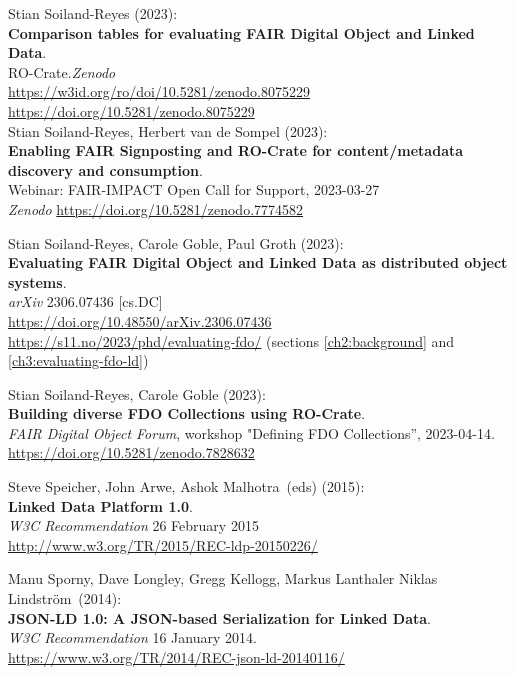 \begin{thebibliography}{9}
Stian Soiland-Reyes (2023):\\
\textbf{Comparison tables for evaluating FAIR Digital Object and Linked Data}.\\
RO-Crate.\emph{Zenodo}\\
\url{https://w3id.org/ro/doi/10.5281/zenodo.8075229}\\
\url{https://doi.org/10.5281/zenodo.8075229}\\

Stian Soiland-Reyes, Herbert van de Sompel (2023):\\
\textbf{Enabling FAIR Signposting and RO-Crate for content/metadata discovery and consumption}.\\
Webinar: FAIR-IMPACT Open Call for Support, 2023-03-27 \\
\emph{Zenodo}
\url{https://doi.org/10.5281/zenodo.7774582}

Stian Soiland-Reyes, Carole Goble, Paul Groth (2023):\\
\textbf{Evaluating FAIR Digital Object and Linked Data as distributed object systems}.\\
\emph{arXiv} 2306.07436 [cs.DC] \\
\url{https://doi.org/10.48550/arXiv.2306.07436}\\
\url{https://s11.no/2023/phd/evaluating-fdo/}
(sections \vref{ch2:background} and \vref{ch3:evaluating-fdo-ld})

Stian Soiland-Reyes, Carole Goble (2023):\\
\textbf{Building diverse FDO Collections using RO-Crate}.\\
\emph{FAIR Digital Object Forum}, workshop "Defining FDO Collections”, 2023-04-14.\\
\url{https://doi.org/10.5281/zenodo.7828632}

Steve Speicher, John Arwe, Ashok Malhotra~(eds) (2015):\\
\textbf{Linked Data Platform 1.0}.\\ 
\emph{W3C Recommendation} 26 February 2015\\
\url{http://www.w3.org/TR/2015/REC-ldp-20150226/}

Manu Sporny, Dave Longley,  Gregg Kellogg,  Markus Lanthaler
Niklas Lindström~(2014):\\
\textbf{JSON-LD 1.0: A JSON-based Serialization for Linked Data}.\\
\emph{W3C Recommendation} 16 January 2014.\\
\url{https://www.w3.org/TR/2014/REC-json-ld-20140116/}


\end{thebibliography}
